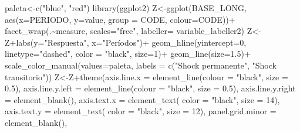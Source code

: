 \documentclass[
]{book}
\newenvironment{Shaded}{\begin{snugshade}}{\end{snugshade}}
\newcommand{\AttributeTok}[1]{\textcolor[rgb]{0.77,0.63,0.00}{#1}}
\newcommand{\DecValTok}[1]{\textcolor[rgb]{0.00,0.00,0.81}{#1}}
\newcommand{\FloatTok}[1]{\textcolor[rgb]{0.00,0.00,0.81}{#1}}
\newcommand{\FunctionTok}[1]{\textcolor[rgb]{0.00,0.00,0.00}{#1}}
\newcommand{\NormalTok}[1]{#1}
\newcommand{\OtherTok}[1]{\textcolor[rgb]{0.56,0.35,0.01}{#1}}
\newcommand{\SpecialCharTok}[1]{\textcolor[rgb]{0.00,0.00,0.00}{#1}}
\newcommand{\StringTok}[1]{\textcolor[rgb]{0.31,0.60,0.02}{#1}}
\begin{document}
\begin{Shaded}
\begin{Highlighting}[]
\NormalTok{paleta}\OtherTok{\textless{}{-}}\FunctionTok{c}\NormalTok{(}\StringTok{"blue"}\NormalTok{, }\StringTok{"red"}\NormalTok{)}
\FunctionTok{library}\NormalTok{(ggplot2)}
\NormalTok{Z}\OtherTok{\textless{}{-}}\FunctionTok{ggplot}\NormalTok{(BASE\_LONG, }\FunctionTok{aes}\NormalTok{(}\AttributeTok{x=}\NormalTok{PERIODO, }\AttributeTok{y=}\NormalTok{value, }\AttributeTok{group =}\NormalTok{ CODE,}
                         \AttributeTok{colour=}\NormalTok{CODE))}\SpecialCharTok{+}
  \FunctionTok{facet\_wrap}\NormalTok{(.}\SpecialCharTok{\textasciitilde{}}\NormalTok{measure, }\AttributeTok{scales=}\StringTok{"free"}\NormalTok{, }\AttributeTok{labeller=}\NormalTok{ variable\_labeller2)}
\NormalTok{Z}\OtherTok{\textless{}{-}}\NormalTok{Z}\SpecialCharTok{+}\FunctionTok{labs}\NormalTok{(}\AttributeTok{y=}\StringTok{"Respuesta"}\NormalTok{,}
          \AttributeTok{x=}\StringTok{"Períodos"}\NormalTok{)}\SpecialCharTok{+}
  \FunctionTok{geom\_hline}\NormalTok{(}\AttributeTok{yintercept=}\DecValTok{0}\NormalTok{, }\AttributeTok{linetype=}\StringTok{"dashed"}\NormalTok{,}
             \AttributeTok{color =} \StringTok{"black"}\NormalTok{, }\AttributeTok{size=}\DecValTok{1}\NormalTok{)}\SpecialCharTok{+}
  \FunctionTok{geom\_line}\NormalTok{(}\AttributeTok{size=}\FloatTok{1.5}\NormalTok{)}\SpecialCharTok{+}
  \FunctionTok{scale\_color\_manual}\NormalTok{(}\AttributeTok{values=}\NormalTok{paleta,}
                     \AttributeTok{labels =} \FunctionTok{c}\NormalTok{(}\StringTok{"Shock permanente"}\NormalTok{, }
                                \StringTok{"Shock transitorio"}\NormalTok{))}
\NormalTok{Z}\OtherTok{\textless{}{-}}\NormalTok{Z}\SpecialCharTok{+}\FunctionTok{theme}\NormalTok{(}\AttributeTok{axis.line.x =} \FunctionTok{element\_line}\NormalTok{(}\AttributeTok{colour =} \StringTok{"black"}\NormalTok{, }\AttributeTok{size =} \FloatTok{0.5}\NormalTok{),}
           \AttributeTok{axis.line.y.left  =} \FunctionTok{element\_line}\NormalTok{(}\AttributeTok{colour =} \StringTok{"black"}\NormalTok{, }\AttributeTok{size =} \FloatTok{0.5}\NormalTok{),}
           \AttributeTok{axis.line.y.right =} \FunctionTok{element\_blank}\NormalTok{(),}
           \AttributeTok{axis.text.x =} \FunctionTok{element\_text}\NormalTok{( }\AttributeTok{color =} \StringTok{"black"}\NormalTok{, }\AttributeTok{size =} \DecValTok{14}\NormalTok{),}
           \AttributeTok{axis.text.y =} \FunctionTok{element\_text}\NormalTok{( }\AttributeTok{color =} \StringTok{"black"}\NormalTok{, }\AttributeTok{size =} \DecValTok{12}\NormalTok{),}
           \AttributeTok{panel.grid.minor =} \FunctionTok{element\_blank}\NormalTok{(),}

\end{Highlighting}
\end{Shaded}
\end{document}
